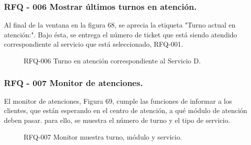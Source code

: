 \subsubsection{RFQ - 006 Mostrar últimos turnos en atención.}

Al final de la ventana en la figura 68, se aprecia la etiqueta "Turno actual en atención:". Bajo ésta, se entrega el número de ticket que está siendo atendido correspondiente al servicio que está seleccionado, RFQ-001.

\begin{figure}[H]
\centering
\setlength\fboxsep{0pt}
\setlength\fboxrule{0.5pt}
\caption{RFQ-006 Turno en atención correspondiente al Servicio D.}
\label{rfq006}
\end{figure}

\subsubsection{RFQ - 007 Monitor de atenciones.}

El monitor de atenciones, Figura 69, cumple las funciones de informar a los clientes, que están esperando en el centro de atención, a qué módulo de atención deben pasar. para ello, se muestra el número de turno y el tipo de servicio.

\begin{figure}[H]
\centering
\setlength\fboxsep{0pt}
\setlength\fboxrule{0.5pt}
\caption{RFQ-007 Monitor muestra turno, módulo y servicio.}
\label{rfq007}
\end{figure}


